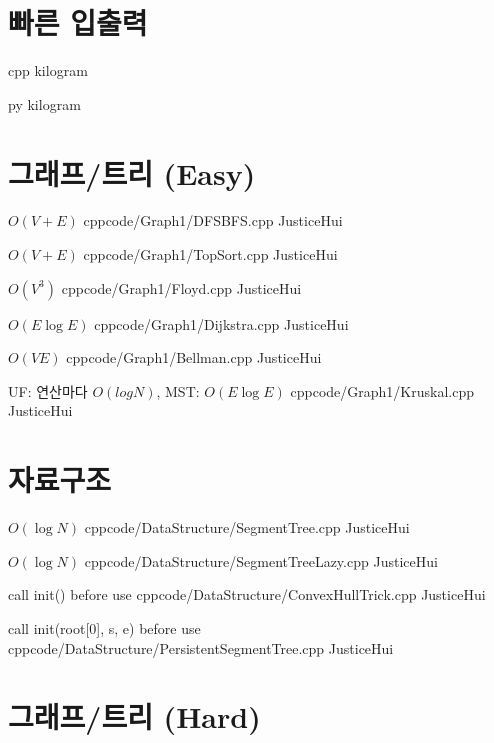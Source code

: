 \documentclass[landscape, 8pt, a4paper, twocolumn]{extarticle} %
\begin{document}
\maketitlepage

\pagebreak 

\section{빠른 입출력}

{}{}
{cpp}{}
{kilogram}

{}{}
{py}{}
{kilogram}

\section{그래프/트리 (Easy)}

{}{$O(V+E)$}
{cpp}{code/Graph1/DFSBFS.cpp}
{JusticeHui}

{}{$O(V+E)$}
{cpp}{code/Graph1/TopSort.cpp}
{JusticeHui}

{}{$O(V^3)$}
{cpp}{code/Graph1/Floyd.cpp}
{JusticeHui}

{}{$O(E\log E)$}
{cpp}{code/Graph1/Dijkstra.cpp}
{JusticeHui}

{}{$O(VE)$}
{cpp}{code/Graph1/Bellman.cpp}
{JusticeHui}

{}{UF: 연산마다 $O(log N)$, MST: $O(E \log E)$}
{cpp}{code/Graph1/Kruskal.cpp}
{JusticeHui}

\section{자료구조}

{}{$O(\log N)$}
{cpp}{code/DataStructure/SegmentTree.cpp}
{JusticeHui}

{}{$O(\log N)$}
{cpp}{code/DataStructure/SegmentTreeLazy.cpp}
{JusticeHui}

{call init() before use}{}
{cpp}{code/DataStructure/ConvexHullTrick.cpp}
{JusticeHui}

{call init(root[0], s, e) before use}{}
{cpp}{code/DataStructure/PersistentSegmentTree.cpp}
{JusticeHui}

\section{그래프/트리 (Hard)}
\end{document}
